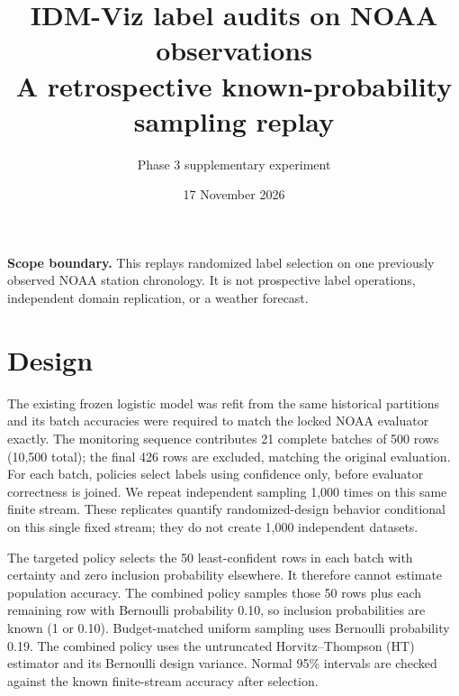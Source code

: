 \documentclass[10pt,a4paper]{article}
\title{\vspace{-2em}\color{ink}\bfseries IDM-Viz label audits on NOAA observations\\[-.2em]\large A retrospective known-probability sampling replay}
\author{Phase 3 supplementary experiment}\date{17 November 2026}
\begin{document}
\maketitle\vspace{-1em}
\begin{tcolorbox}[colback=mist,colframe=teal,boxrule=0pt,leftrule=2mm]\textbf{Scope boundary.} This replays randomized label selection on one previously observed NOAA station chronology. It is not prospective label operations, independent domain replication, or a weather forecast.
\end{tcolorbox}
\section*{Design}
The existing frozen logistic model was refit from the same historical partitions and its batch accuracies were required to match the locked NOAA evaluator exactly. The monitoring sequence contributes 21 complete batches of 500 rows (10,500 total); the final 426 rows are excluded, matching the original evaluation. For each batch, policies select labels using confidence only, before evaluator correctness is joined. We repeat independent sampling 1,000 times on this same finite stream. These replicates quantify randomized-design behavior conditional on this single fixed stream; they do not create 1,000 independent datasets.

The targeted policy selects the 50 least-confident rows in each batch with certainty and zero inclusion probability elsewhere. It therefore cannot estimate population accuracy. The combined policy samples those 50 rows plus each remaining row with Bernoulli probability 0.10, so inclusion probabilities are known (1 or 0.10). Budget-matched uniform sampling uses Bernoulli probability 0.19. The combined policy uses the untruncated Horvitz--Thompson (HT) estimator and its Bernoulli design variance. Normal 95\% intervals are checked against the known finite-stream accuracy after selection.
\end{document}
